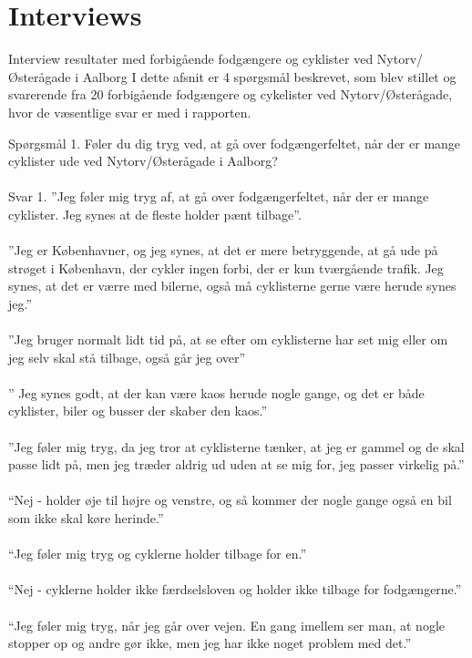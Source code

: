 \appendix
\label{appendix_start}
\chapter{Interviews}
  \label{chap:interviews}
Interview resultater med forbigående fodgængere og cyklister ved Nytorv/Østerågade i Aalborg I dette afsnit er 4 spørgsmål beskrevet, som blev stillet og svarerende fra 20 forbigående fodgængere og cykelister ved Nytorv/Østerågade, hvor de væsentlige svar er med i rapporten.

  Spørgsmål 1.
  Føler du dig tryg ved, at gå over fodgængerfeltet, når der er mange cyklister ude ved Nytorv/Østerågade i Aalborg?
\\\\
  Svar 1.
  ”Jeg føler mig tryg af, at gå over fodgængerfeltet, når der er mange cyklister. Jeg synes at de fleste holder pænt tilbage”.
\\\\
  ”Jeg er Københavner, og jeg synes, at det er mere betryggende, at gå ude på strøget i København, der cykler ingen forbi, der er kun tværgående trafik. Jeg synes, at det er værre med bilerne, også må cyklisterne gerne være herude synes jeg.”
\\\\
  ”Jeg bruger normalt lidt tid på, at se efter om cyklisterne har set mig eller om jeg selv skal stå tilbage, også går jeg over”
\\\\
  ” Jeg synes godt, at der kan være kaos herude nogle gange, og det er både cyklister, biler og busser der skaber den kaos.”
\\\\
  ”Jeg føler mig tryg, da jeg tror at cyklisterne tænker, at jeg er gammel og de skal passe lidt på, men jeg træder aldrig ud uden at se mig for, jeg passer virkelig på.”
\\\\
  “Nej - holder øje til højre og venstre, og så kommer der nogle gange også en bil som ikke skal køre herinde.”
\\\\
  “Jeg føler mig tryg og cyklerne holder tilbage for en.”
\\\\
  “Nej - cyklerne holder ikke færdselsloven og holder ikke tilbage for fodgængerne.”
\\\\
  “Jeg føler mig tryg, når jeg går over vejen. En gang imellem ser man, at nogle stopper op og andre gør ikke, men jeg har ikke noget problem med det.”
